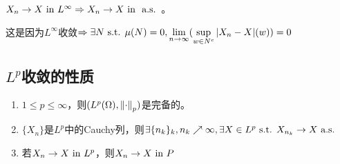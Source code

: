 \documentclass{ctexbook}
\begin{document}
  \begin{Eg}
    $X_{n}\to X\text{ in } L^{\infty}\Rightarrow X_{n}\to X\text{ in } \text{ a.s. }$。

    这是因为$L^{\infty}$收敛$\Rightarrow \exists N\text{ s.t. } \mu(N)=0,\lim\limits_{n\to\infty}(\sup\limits_{w\in N^{c}}|X_{n}-X|(w))=0$
  \end{Eg}


\subsection{$L^p$收敛的性质}
\begin{Thm}
  \begin{enumerate}
  \item $1\leq p\leq \infty$，则$(L^{p}(\Omega),\left\|\cdot\right\|_{p})$是完备的。
  \item $\{X_{n}\}$是$L^{p}$中的Cauchy列，则$\exists \{n_{k}\}_{k},n_{k}\nearrow \infty,\exists X\in L^{p}\text{ s.t. } X_{n_{k}}\to X\text{ a.s. }$
  \item 若$X_{n}\to X\text{ in } L^{p}$，则$X_{n}\to X\text{ in } P$
  \end{enumerate}
  \end{Thm}
\end{document}
